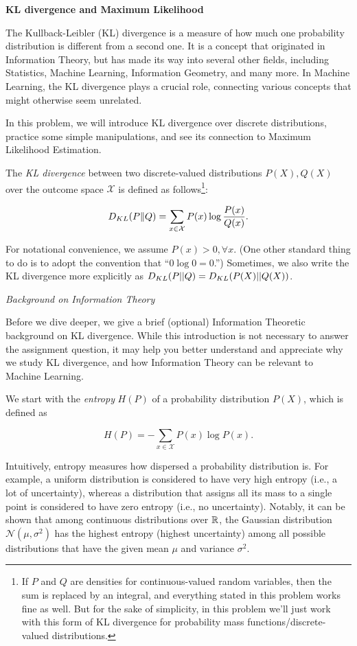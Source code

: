 \item {} {\bf KL divergence and Maximum Likelihood}

The Kullback-Leibler (KL) divergence is a measure of how much
one probability distribution is different from a second one. It is a concept that originated in Information Theory, but has made its
way into several other fields, including Statistics, Machine Learning,
Information Geometry, and many more. In Machine Learning, the KL
divergence plays a crucial role, connecting various concepts
that might otherwise seem unrelated.

In this problem, we will introduce KL divergence over discrete
distributions, practice some simple manipulations, and see its
connection to Maximum Likelihood Estimation.

The \emph{KL divergence} between two discrete-valued
distributions $P(X), Q(X)$  over the outcome space $\mathcal{X}$ is defined as follows\footnote{If $P$ and $Q$ are densities for continuous-valued random variables, then the sum is replaced by an integral, and everything stated in this problem works fine as well.  But for the sake of simplicity, in this problem we'll just work with this form of KL divergence for probability mass functions/discrete-valued distributions.}:

$$D_{KL}(P\|Q) = \sum_{x \in \mathcal{X}}P(x)\log\frac{P(x)}{Q(x)}.$$

For notational convenience, we assume $P(x)>0, \forall x$.
(One other standard thing to do is to adopt the convention that
``$0 \log 0 = 0$.'')  Sometimes, we also write the KL divergence more explicitly as
$D_{KL}(P||Q) = D_{KL}(P(X)||Q(X))$.

\emph{Background on Information Theory}

Before we dive deeper, we give a brief (optional) Information Theoretic
background on KL divergence. While this introduction is not necessary
to answer the assignment question, it may help you better understand
and appreciate why we study KL divergence, and how Information Theory
can be relevant to Machine Learning.

We start with the \emph{entropy} $H(P)$ of a probability distribution $P(X)$, which is defined as

$$ H(P) = -\sum_{x \in \mathcal{X}} P(x) \log P(x). $$

Intuitively, entropy measures how dispersed a probability
distribution is. For example, a uniform distribution is considered to have
very high entropy (i.e., a lot of uncertainty), whereas a distribution that assigns
all its mass to a single point is considered to have zero entropy (i.e., no uncertainty). Notably, it can be shown that among continuous distributions over $\mathbb{R}$, the Gaussian
distribution $\mathcal{N}(\mu,\sigma^2)$ has the highest entropy (highest uncertainty) among all possible distributions that have the given mean $\mu$ and variance $\sigma^2$.

